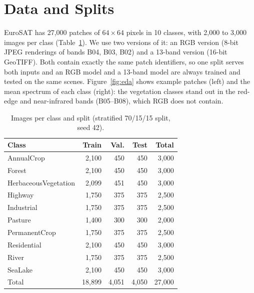 \documentclass[conference]{IEEEtran}
\begin{document}
\section{Data and Splits}\label{sec:data}
EuroSAT has 27{,}000 patches of $64\times64$ pixels in 10 classes, with 2{,}000 to 3{,}000 images per class (Table~\ref{tab:classes}). We use two versions of it: an RGB version (8-bit JPEG renderings of bands B04, B03, B02) and a 13-band version (16-bit GeoTIFF). Both contain exactly the same patch identifiers, so one split serves both inputs and an RGB model and a 13-band model are always trained and tested on the same scenes. Figure~\ref{fig:eda} shows example patches (left) and the mean spectrum of each class (right): the vegetation classes stand out in the red-edge and near-infrared bands (B05--B08), which RGB does not contain.
\begin{table}[t]
\centering
\caption{Images per class and split (stratified 70/15/15 split, seed 42).}
\label{tab:classes}
\small
\begin{tabular}{lrrrr}
\toprule
Class & Train & Val. & Test & Total \\
\midrule
AnnualCrop & 2{,}100 & 450 & 450 & 3{,}000 \\
Forest & 2{,}100 & 450 & 450 & 3{,}000 \\
HerbaceousVegetation & 2{,}099 & 451 & 450 & 3{,}000 \\
Highway & 1{,}750 & 375 & 375 & 2{,}500 \\
Industrial & 1{,}750 & 375 & 375 & 2{,}500 \\
Pasture & 1{,}400 & 300 & 300 & 2{,}000 \\
PermanentCrop & 1{,}750 & 375 & 375 & 2{,}500 \\
Residential & 2{,}100 & 450 & 450 & 3{,}000 \\
River & 1{,}750 & 375 & 375 & 2{,}500 \\
SeaLake & 2{,}100 & 450 & 450 & 3{,}000 \\
\midrule
Total & 18{,}899 & 4{,}051 & 4{,}050 & 27{,}000 \\
\bottomrule
\end{tabular}
\end{table}
\end{document}
